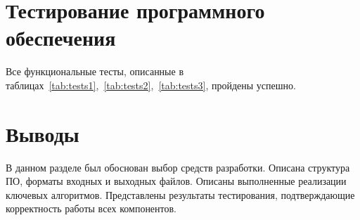 \section{Тестирование программного обеспечения}

Все функциональные тесты, описанные в таблицах~\ref{tab:tests1},~\ref{tab:tests2},~\ref{tab:tests3}, пройдены успешно.

\section*{Выводы}


В данном разделе был обоснован выбор средств разработки.
Описана структура ПО, форматы входных и выходных файлов.
Описаны выполненные реализации ключевых алгоритмов.
Представлены результаты тестирования, подтверждающие корректность работы всех компонентов.